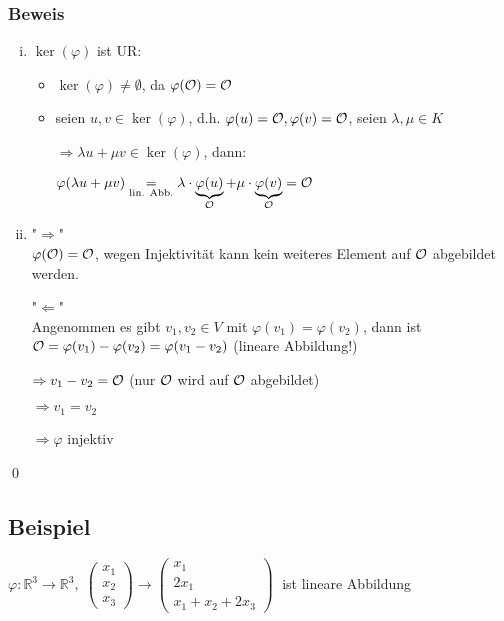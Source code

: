 \subsubsection*{Beweis}

\begin{enumerate}[(i)]
	\item
	$\ker(\varphi)$ ist UR:
	
	\begin{itemize}
		\item
		$\ker(\varphi) \neq \emptyset$, da $\varphi(\mathcal{O}) = \mathcal{O}$
		
		\item
		seien $u,v \in \ker(\varphi)$, d.h. $\varphi(u) = \mathcal{O}, \varphi(v) = \mathcal{O}$, seien $\lambda, \mu \in K$
		
		$\Rightarrow \lambda u + \mu v \in \ker(\varphi)$, dann:
		
		$\varphi(\lambda u + \mu v) \underset{\text{lin. Abb.}}{=} \lambda \cdot \underbrace{\varphi(u)}_{\mathcal{O}} +
		\mu \cdot \underbrace{\varphi(v)}_{\mathcal{O}} = \mathcal{O}$
	\end{itemize}
	
	\item
	"$\Rightarrow$"\\
	$\varphi(\mathcal{O}) = \mathcal{O}$, wegen Injektivität kann kein weiteres Element auf $\mathcal{O}$ abgebildet werden.
	
	"$\Leftarrow$"\\
	Angenommen es gibt $v_1,v_2 \in V$ mit $\varphi(v_1) = \varphi(v_2)$, dann ist $\mathcal{O} = \varphi(v_1) - \varphi(v_2) \\= \varphi(v_1 - v_2)$ (lineare Abbildung!)
	
	$\Rightarrow v_1 - v_2 = \mathcal{O}$ (nur $\mathcal{O}$ wird auf $\mathcal{O}$ abgebildet)
	
	$\Rightarrow v_1 = v_2$
	
	$\Rightarrow \varphi$ injektiv
\end{enumerate}
\qed

\subsection{Beispiel}

$\varphi: \mathbb{R}^3 \rightarrow \mathbb{R}^3, \;
\begin{pmatrix}
x_1\\x_2\\x_3
\end{pmatrix} \rightarrow
\begin{pmatrix}
x_1\\2x_1\\x_1 + x_2 + 2x_3
\end{pmatrix}
\;$
 ist lineare Abbildung\bigskip

